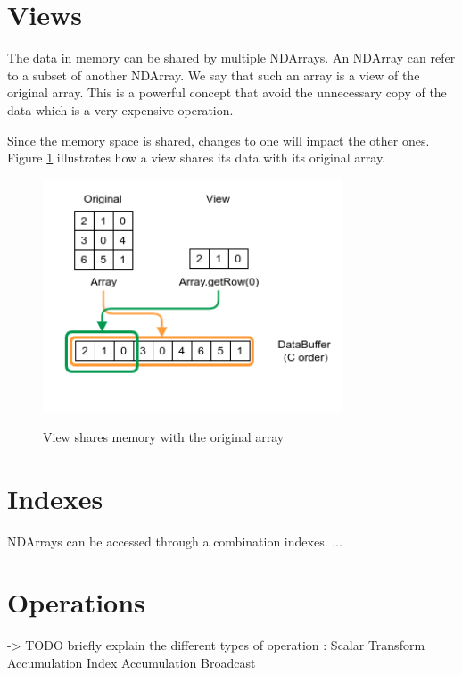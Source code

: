 \section{Views}

The data in memory can be shared by multiple NDArrays. An NDArray can refer to a subset of another NDArray. We say that such an array is a view of the original array. This is a powerful concept that avoid the unnecessary copy of the data which is a very expensive operation.

Since the memory space is shared, changes to one will impact the other ones. Figure \ref{fig:sharememView} illustrates how a view shares its data with its original array.

\begin{figure}[h]
	\begin{center}
		\includegraphics[width=3.5in]{images/views.png} 
		\label{fig:sharememView}
		\caption{View shares memory with the original array}
	\end{center}
\end{figure}
\section{Indexes}

NDArrays can be accessed through a combination indexes.
...
\section{Operations}
-> TODO briefly explain the different types of operation :
Scalar
Transform
Accumulation
Index Accumulation
Broadcast